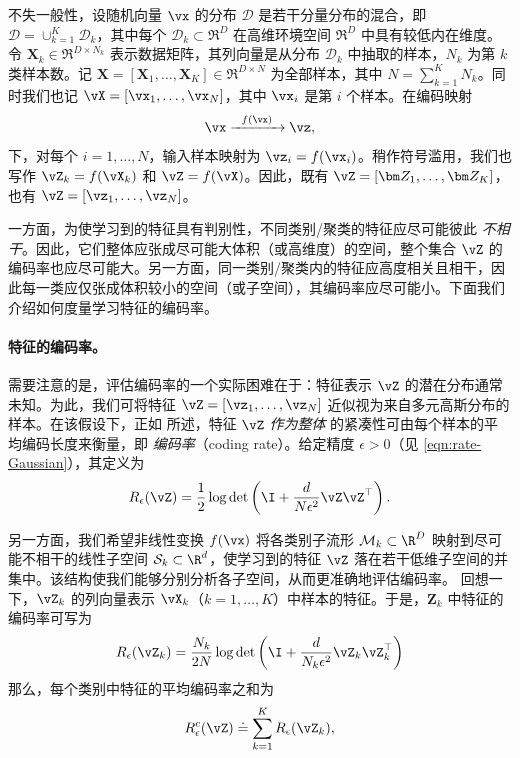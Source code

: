\documentclass[../../book-main_zh.tex]{subfiles}
\begin{document}
不失一般性，设随机向量 $\vx$ 的分布 $\mathcal D$ 是若干分量分布的混合，即 $\mathcal D = \cup_{k=1}^K \mathcal{D}_k$，其中每个 $\mathcal{D}_k \subset \Re^D$ 在高维环境空间 $\Re^D$ 中具有较低内在维度。令 $\bm X_k \in \Re^{D\times N_k}$ 表示数据矩阵，其列向量是从分布 $\mathcal{D}_k$ 中抽取的样本，$N_k$ 为第 $k$ 类样本数。记 $\bm X=[\bm X_1,\dots,\bm X_K] \in \Re^{D\times N}$ 为全部样本，其中 $N=\sum_{k=1}^K N_k$。同时我们也记 $\vX=[\vx_1,\dots,\vx_N]$，其中 $\vx_i$ 是第 $i$ 个样本。在编码映射
\begin{equation}
    \vx  \xrightarrow{\hspace{2mm} f(\vx)\hspace{2mm}} \vz,
\end{equation}
下，对每个 $i=1,\dots,N$，输入样本映射为 $\vz_i = f(\vx_i)$。稍作符号滥用，我们也写作 $\vZ_k = f(\vX_k)$ 和 $\vZ = f(\vX)$。因此，既有 $\vZ = [\bm Z_1,\dots,\bm Z_K]$，也有 $\vZ = [\vz_1,\dots,\vz_N]$。

一方面，为使学习到的特征具有判别性，不同类别/聚类的特征应尽可能彼此 {\em 不相干}。因此，它们整体应张成尽可能大体积（或高维度）的空间，整个集合 $\vZ$ 的编码率也应尽可能大。另一方面，同一类别/聚类内的特征应高度相关且相干，因此每一类应仅张成体积较小的空间（或子空间），其编码率应尽可能小。下面我们介绍如何度量学习特征的编码率。

\paragraph{特征的编码率。} 需要注意的是，评估编码率的一个实际困难在于：特征表示 $\vZ$ 的潜在分布通常未知。为此，我们可将特征 $\vZ = [\vz_1, \ldots, \vz_N]$ 近似视为来自多元高斯分布的样本。在该假设下，正如  所述，特征 $\vZ$ {\em 作为整体} 的紧凑性可由每个样本的平均编码长度来衡量，即 {\em 编码率}（coding rate）。给定精度 $\epsilon > 0$（见 \eqref{eqn:rate-Gaussian}），其定义为
\begin{equation}
    R_{\epsilon}(\vZ) = \frac{1}{2}\log\det\left(\I +
    \frac{d}{N\epsilon^{2}}\vZ\vZ^{\top}\right).
    \label{chap4-eqn:coding-length-eval}
\end{equation}

另一方面，我们希望非线性变换 $f(\vx)$ 将各类别子流形 $\mathcal{M}_k \subset \R^D$ 映射到尽可能不相干的线性子空间 $\mathcal{S}_k \subset \R^d$，使学习到的特征 $\vZ$ 落在若干低维子空间的并集中。该结构使我们能够分别分析各子空间，从而更准确地评估编码率。%
回想一下，$\vZ_k$ 的列向量表示 $\vX_k$（$k=1,\dots,K$）中样本的特征。于是，$\bm Z_k$ 中特征的编码率可写为
\begin{align}
    R_{\epsilon}(\vZ_k) = \frac{N_k}{2N}\log\det\left(\I +
    \frac{d}{N_k\epsilon^{2}}\vZ_k\vZ_k^{\top}\right)
\end{align}
那么，每个类别中特征的平均编码率之和为
\begin{equation}
    R_{\epsilon}^c(\vZ) \doteq \sum_{k=1}^K R_{\epsilon}(\vZ_k),
    \label{chap4-eqn:compress-loss-eval}
\end{equation}
\end{document}
